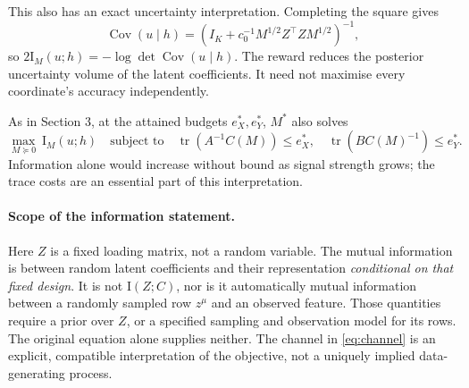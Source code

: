 \documentclass[11pt,a4paper]{article}
\newcommand{\tr}{\operatorname{tr}}
\newcommand{\Id}{\mathrm I}
\begin{document}
This also has an exact uncertainty interpretation. Completing the square gives
\begin{equation}
 \operatorname{Cov}(u\mid h)
 =\left(I_K+c_0^{-1}M^{1/2}Z^\top ZM^{1/2}\right)^{-1},
\end{equation}
so $2\Id_M(u;h)=-\log\det\operatorname{Cov}(u\mid h)$.
The reward reduces the posterior uncertainty volume of the latent
coefficients. It need not maximise every coordinate's accuracy independently.

As in Section 3, at the attained budgets $e_X^*,e_Y^*$, $M^*$ also solves
\begin{equation}
 \max_{M\succeq0}\ \Id_M(u;h)
 \quad\text{subject to}\quad
 \tr(A^{-1}C(M))\le e_X^*,\quad
 \tr(BC(M)^{-1})\le e_Y^*.
\end{equation}
Information alone would increase without bound as signal strength grows;
the trace costs are an essential part of this interpretation.

\paragraph{Scope of the information statement.}
Here $Z$ is a fixed loading matrix, not a random variable. The mutual
information is between random latent coefficients and their representation
\emph{conditional on that fixed design}. It is not $\Id(Z;C)$, nor is it
automatically mutual information between a randomly sampled row $z^\mu$
and an observed feature. Those quantities require a prior over $Z$, or a
specified sampling and observation model for its rows.
The original equation alone supplies neither. The channel in
\eqref{eq:channel} is an explicit, compatible interpretation of the objective,
not a uniquely implied data-generating process.
\end{document}
